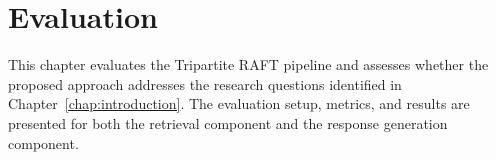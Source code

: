 
\chapter{Evaluation}
\label{chap:evaluation}

This chapter evaluates the Tripartite RAFT pipeline and assesses whether the proposed approach addresses the research questions identified in Chapter~\ref{chap:introduction}.
The evaluation setup, metrics, and results are presented for both the retrieval component and the response generation component.







